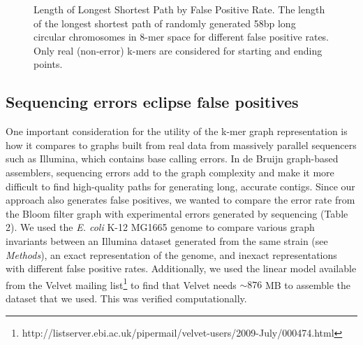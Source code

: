 \documentclass[12pt]{article} \usepackage{simplemargins}
\begin{document}
\begin{figure}

\caption{Length of Longest Shortest Path by False Positive Rate. The
  length of the longest shortest path of randomly generated 58bp long
  circular chromosomes in 8-mer space for different false positive
  rates. Only real (non-error) k-mers are considered for starting and
  ending points.}
\end{figure}

\subsection{Sequencing errors eclipse false positives}

One important consideration for the utility of the k-mer graph
representation is how it compares to graphs built from real data from
massively parallel sequencers such as Illumina, which contains base
calling errors.  In de Bruijn graph-based assemblers, sequencing
errors add to the graph complexity and make it more difficult to find
high-quality paths for generating long, accurate contigs. Since our
approach also generates false positives, we wanted to compare the
error rate from the Bloom filter graph with experimental errors
generated by sequencing (Table 2). We used the \emph{E. coli} K-12
MG1665 genome to compare various graph invariants between an Illumina
dataset generated from the same strain (see \emph{Methods}), an exact
representation of the genome, and inexact representations with
different false positive rates. Additionally, we used the linear model
available from the Velvet mailing
list\footnote{http://listserver.ebi.ac.uk/pipermail/velvet-users/2009-July/000474.html}
to find that Velvet needs $\sim 876$ MB to assemble the dataset that
we used.  This was verified computationally.
\end{document}

